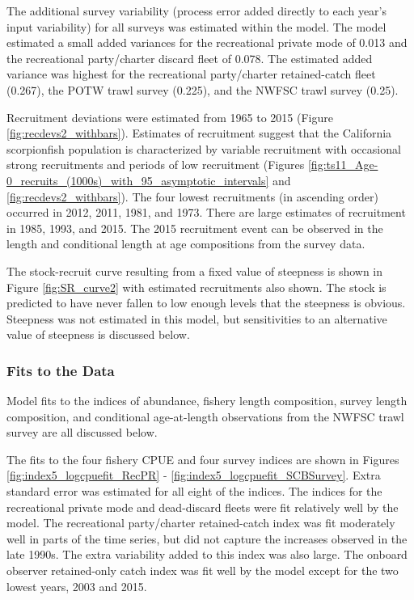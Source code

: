 \documentclass[12pt,]{article}
\begin{document}
The additional survey variability (process error added directly to each
year's input variability) for all surveys was estimated within the
model. The model estimated a small added variances for the recreational
private mode of 0.013 and the recreational party/charter discard fleet
of 0.078. The estimated added variance was highest for the recreational
party/charter retained-catch fleet (0.267), the POTW trawl survey
(0.225), and the NWFSC trawl survey (0.25).

Recruitment deviations were estimated from 1965 to 2015 (Figure
\ref{fig:recdevs2_withbars}). Estimates of recruitment suggest that the
California scorpionfish population is characterized by variable
recruitment with occasional strong recruitments and periods of low
recruitment (Figures
\ref{fig:ts11_Age-0_recruits_(1000s)_with_95_asymptotic_intervals} and
\ref{fig:recdevs2_withbars}). The four lowest recruitments (in ascending
order) occurred in 2012, 2011, 1981, and 1973. There are large estimates
of recruitment in 1985, 1993, and 2015. The 2015 recruitment event can
be observed in the length and conditional length at age compositions
from the survey data.

The stock-recruit curve resulting from a fixed value of steepness is
shown in Figure \ref{fig:SR_curve2} with estimated recruitments also
shown. The stock is predicted to have never fallen to low enough levels
that the steepness is obvious. Steepness was not estimated in this
model, but sensitivities to an alternative value of steepness is
discussed below.

\subsubsection{Fits to the Data}\label{fits-to-the-data}

Model fits to the indices of abundance, fishery length composition,
survey length composition, and conditional age-at-length observations
from the NWFSC trawl survey are all discussed below.

The fits to the four fishery CPUE and four survey indices are shown in
Figures \ref{fig:index5_logcpuefit_RecPR} -
\ref{fig:index5_logcpuefit_SCBSurvey}. Extra standard error was
estimated for all eight of the indices. The indices for the recreational
private mode and dead-discard fleets were fit relatively well by the
model. The recreational party/charter retained-catch index was fit
moderately well in parts of the time series, but did not capture the
increases observed in the late 1990s. The extra variability added to
this index was also large. The onboard observer retained-only catch
index was fit well by the model except for the two lowest years, 2003
and 2015.
\end{document}
